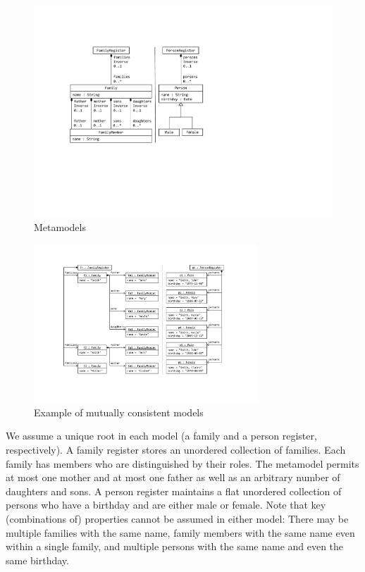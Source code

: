 \begin{figure}[tb!]
	\centering
	\includegraphics[width=\columnwidth]{diagrams/Metamodels}
	\caption{Metamodels}
	\label{fig:metamodels}
\end{figure}

\begin{figure}[tb!]
	\centering
	\includegraphics[width=0.75\textwidth]{diagrams/Models}
	\caption{Example of mutually consistent models}
	\label{fig:models}
\end{figure}

We assume a unique root in each model (a family and a person register, respectively). 
A family register stores an unordered collection of families. 
Each family has members who are distinguished by their roles. 
The metamodel permits at most one mother and at most one father as well as an arbitrary number of daughters and sons. 
A person register maintains a flat unordered collection of persons who have a birthday and are either male or female. 
Note that key (combinations of) properties cannot be assumed in either model: There may be multiple families with the same name, family members with the same name even within a single family, and multiple persons with the same name and even the same birthday. 

